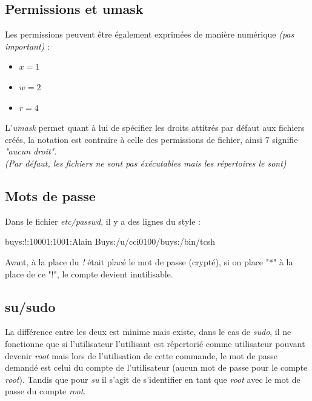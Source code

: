 \documentclass{article}
\newcommand{\titre}[1]{\textcolor{title}{#1}}
\newcommand{\term}[1]{\textit{\textcolor{maintitle}{#1}}}
\begin{document}
\begin{sffamily}
\titre{\subsection{Permissions et umask}}

\noindent Les permissions peuvent être également exprimées de manière numérique \textit{(pas important)} :
\begin{itemize}
\item $x=1$
\item $w=2$
\item $r=4$
\end{itemize}

\noindent L'\term{umask} permet quant à lui de spécifier les droits attitrés par défaut aux fichiers créés, la notation 
est contraire à celle des permissions de fichier, ainsi $7$ signifie \textit{"aucun droit"}.\\ \textit{(Par défaut, les 
fichiers ne sont pas éxécutables mais les répertoires le sont)}

\titre{\subsection{Mots de passe}}

Dans le fichier \textit{etc/passwd}, il y a des lignes du style : \\
\begin{center}\begin{boxedverbatim}buys:!:10001:1001:Alain Buys:/u/cci0100/buys:/bin/tcsh\end{boxedverbatim}
\end{center}

Avant, à la place du \term{!} était placé le mot de passe (crypté), si on place "*" à la place de ce "!", le compte 
devient inutilisable.

\titre{\subsection{su/sudo}}

La différence entre les deux est minime mais existe, dans le cas de \term{sudo}, il ne fonctionne que si l'utilisateur
l'utilisant est répertorié comme utilisateur pouvant devenir \term{root} mais lors de l'utilisation de cette commande, 
le mot de passe demandé est celui du compte de l'utilisateur (aucun mot de passe pour le compte \term{root}). Tandis 
que pour \term{su} il s'agit de s'identifier en tant que \term{root} avec le mot de passe du compte \term{root}.


\end{sffamily}
\end{document}
